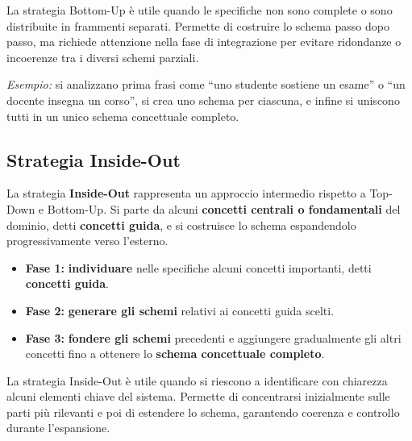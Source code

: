\begin{tcolorbox}[colback=yellow!20,colframe=yellow!50!black,title={\textbf{Nota Bene}},boxrule=0.8pt,arc=2mm]
La strategia Bottom-Up è utile quando le specifiche non sono complete o sono distribuite in frammenti separati.  
Permette di costruire lo schema passo dopo passo, ma richiede attenzione nella fase di integrazione per evitare ridondanze o incoerenze tra i diversi schemi parziali.
\end{tcolorbox}

\begin{center}
\textit{Esempio:} si analizzano prima frasi come “uno studente sostiene un esame” o “un docente insegna un corso”, si crea uno schema per ciascuna, e infine si uniscono tutti in un unico schema concettuale completo.
\end{center}

\subsection{Strategia Inside-Out}

La strategia \textbf{Inside-Out} rappresenta un approccio intermedio rispetto a Top-Down e Bottom-Up.  
Si parte da alcuni \textbf{concetti centrali o fondamentali} del dominio, detti \textbf{concetti guida}, e si costruisce lo schema espandendolo progressivamente verso l’esterno.

\begin{itemize}
  \item \textbf{Fase 1:} \textbf{individuare} nelle specifiche alcuni concetti importanti, detti \textbf{concetti guida}.  
  \item \textbf{Fase 2:} \textbf{generare gli schemi} relativi ai concetti guida scelti.  
  \item \textbf{Fase 3:} \textbf{fondere gli schemi} precedenti e aggiungere gradualmente gli altri concetti fino a ottenere lo \textbf{schema concettuale completo}.
\end{itemize}

\begin{tcolorbox}[colback=yellow!20,colframe=yellow!50!black,title={\textbf{Nota Bene}},boxrule=0.8pt,arc=2mm]
La strategia Inside-Out è utile quando si riescono a identificare con chiarezza alcuni elementi chiave del sistema.  
Permette di concentrarsi inizialmente sulle parti più rilevanti e poi di estendere lo schema, garantendo coerenza e controllo durante l’espansione.
\end{tcolorbox}

